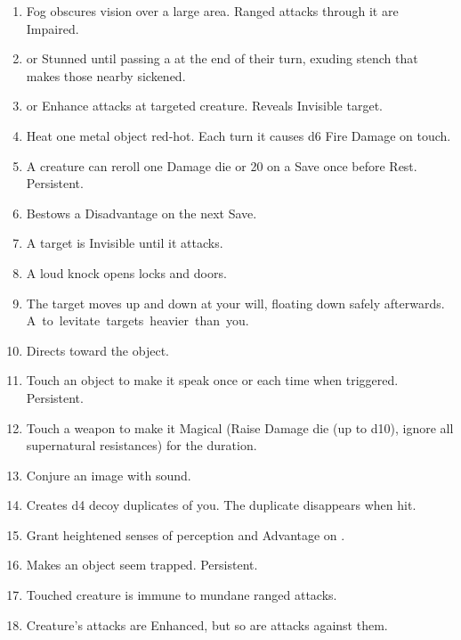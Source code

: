 \documentclass[itdr/core]{subfiles}
\begin{document}
\begin{enumerate}
	\item {} Fog obscures vision over a large area. Ranged attacks through it are Impaired.
	\item {}  or Stunned until passing a   at the end of their turn, exuding stench that makes those nearby sickened.
	\item {}  or Enhance attacks at targeted creature. Reveals Invisible target.
	\item {} Heat one metal object red-hot. Each turn it causes d6 Fire Damage on touch.
	\item {} A creature can reroll one Damage die or 20 on a Save once before Rest. Persistent.
	\item {} Bestows a Disadvantage on the next Save.
	\item {} A target is Invisible until it attacks.
	\item {} A loud knock opens locks and doors.
	\item {} The target moves up and down at your will, floating down safely afterwards. \mbox{A  to levitate targets heavier than you.}
	\item {} Directs toward the object.
	\item {} Touch an object to make it speak once or each time when triggered. Persistent.
	\item {} Touch a weapon to make it Magical (Raise Damage die (up to d10), ignore all supernatural resistances) for the duration.
	\item {} Conjure an image with sound.
	\item {} Creates d4 decoy duplicates of you. The duplicate disappears when hit.
	\item {} Grant heightened senses of perception and Advantage on .
	\item {} Makes an object seem trapped. Persistent.
	\item {} Touched creature is immune to mundane ranged attacks.
	\item {} Creature's attacks are Enhanced, but so are attacks against them.

\end{enumerate}
\end{document}
